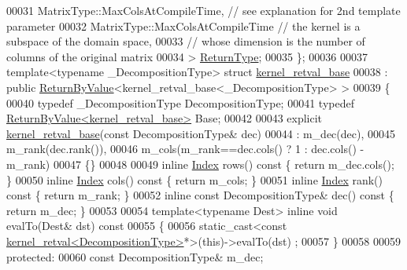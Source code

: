 \begin{DoxyCode}
00031     MatrixType::MaxColsAtCompileTime, \textcolor{comment}{// see explanation for 2nd template parameter}
00032     MatrixType::MaxColsAtCompileTime \textcolor{comment}{// the kernel is a subspace of the domain space,}
00033                                      \textcolor{comment}{// whose dimension is the number of columns of the original matrix}
00034   > \hyperlink{group___core___module_class_eigen_1_1_matrix}{ReturnType};
00035 \};
00036 
00037 \textcolor{keyword}{template}<\textcolor{keyword}{typename} \_DecompositionType> \textcolor{keyword}{struct }\hyperlink{struct_eigen_1_1internal_1_1kernel__retval__base}{kernel\_retval\_base}
00038  : \textcolor{keyword}{public} \hyperlink{group___core___module_class_eigen_1_1_return_by_value}{ReturnByValue}<kernel\_retval\_base<\_DecompositionType> >
00039 \{
00040   \textcolor{keyword}{typedef} \_DecompositionType DecompositionType;
00041   \textcolor{keyword}{typedef} \hyperlink{group___core___module_class_eigen_1_1_return_by_value}{ReturnByValue<kernel\_retval\_base>} Base;
00042 
00043   \textcolor{keyword}{explicit} \hyperlink{struct_eigen_1_1internal_1_1kernel__retval__base}{kernel\_retval\_base}(\textcolor{keyword}{const} DecompositionType& dec)
00044     : m\_dec(dec),
00045       m\_rank(dec.rank()),
00046       m\_cols(m\_rank==dec.cols() ? 1 : dec.cols() - m\_rank)
00047   \{\}
00048 
00049   \textcolor{keyword}{inline} \hyperlink{namespace_eigen_a62e77e0933482dafde8fe197d9a2cfde}{Index} rows()\textcolor{keyword}{ const }\{ \textcolor{keywordflow}{return} m\_dec.cols(); \}
00050   \textcolor{keyword}{inline} \hyperlink{namespace_eigen_a62e77e0933482dafde8fe197d9a2cfde}{Index} cols()\textcolor{keyword}{ const }\{ \textcolor{keywordflow}{return} m\_cols; \}
00051   \textcolor{keyword}{inline} \hyperlink{namespace_eigen_a62e77e0933482dafde8fe197d9a2cfde}{Index} rank()\textcolor{keyword}{ const }\{ \textcolor{keywordflow}{return} m\_rank; \}
00052   \textcolor{keyword}{inline} \textcolor{keyword}{const} DecompositionType& dec()\textcolor{keyword}{ const }\{ \textcolor{keywordflow}{return} m\_dec; \}
00053 
00054   \textcolor{keyword}{template}<\textcolor{keyword}{typename} Dest> \textcolor{keyword}{inline} \textcolor{keywordtype}{void} evalTo(Dest& dst)\textcolor{keyword}{ const}
00055 \textcolor{keyword}{  }\{
00056     \textcolor{keyword}{static\_cast<}\textcolor{keyword}{const }\hyperlink{struct_eigen_1_1internal_1_1kernel__retval}{kernel\_retval<DecompositionType>}*\textcolor{keyword}{>}(\textcolor{keyword}{this})->evalTo(dst)
      ;
00057   \}
00058 
00059   \textcolor{keyword}{protected}:
00060     \textcolor{keyword}{const} DecompositionType& m\_dec;

\end{DoxyCode}
